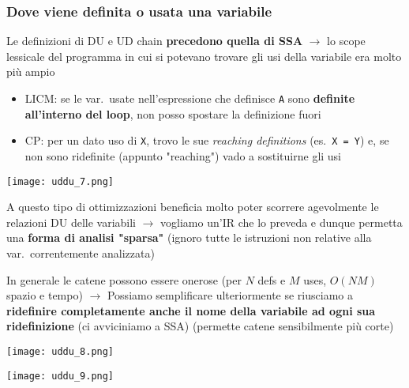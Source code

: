 \subsubsection{Dove viene definita o usata una variabile}

Le definizioni di DU e UD chain \textbf{precedono quella di SSA} $\rightarrow$ lo scope lessicale del programma in cui si potevano trovare gli usi della variabile era molto pi\`u ampio

\begin{example}[frametitle={Esempi}]
  \noindent 
  \begin{minipage}[c]{.65\textwidth}
    \begin{itemize}
      \item LICM: se le var.~usate nell'espressione che definisce \lstinline|A| sono \textbf{definite all'interno del loop}, non posso spostare la definizione fuori
      \item CP: per un dato uso di \lstinline|X|, trovo le sue \textit{reaching definitions} (es.~\lstinline|X = Y|) e, se non sono ridefinite (appunto "reaching") vado a sostituirne gli usi
    \end{itemize}

  \end{minipage}\hfill
  \begin{minipage}[c]{.25\textwidth}
    \texttt{[image: uddu\_7.png]}
  \end{minipage}

  \noindent A questo tipo di ottimizzazioni beneficia molto poter scorrere agevolmente le relazioni DU delle variabili $\rightarrow$ vogliamo un'IR che lo preveda e dunque permetta una \textbf{forma di analisi "sparsa"} (ignoro tutte le istruzioni non relative alla var.~correntemente analizzata)
\end{example}

In generale le catene possono essere onerose (per $N$ defs e $M$ uses, $O(NM)$ spazio e tempo) $\rightarrow$ Possiamo semplificare ulteriormente se riusciamo a \textbf{ridefinire completamente anche il nome della variabile ad ogni sua ridefinizione} (ci avviciniamo a SSA) (permette catene sensibilmente pi\`u corte)

\noindent\begin{minipage}[b]{.45\textwidth}
  \centering
  \texttt{[image: uddu\_8.png]}
\end{minipage}\hfill
\begin{minipage}[b]{.5\textwidth}
  \centering
  \texttt{[image: uddu\_9.png]}
\end{minipage}

